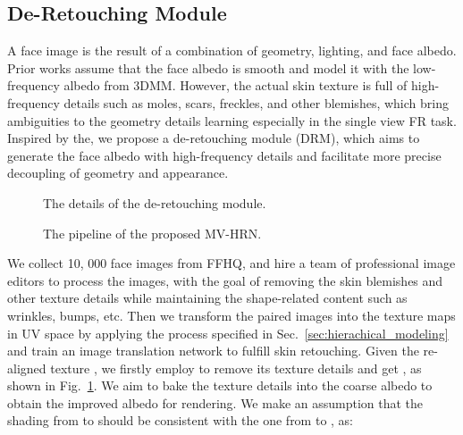\documentclass[10pt,twocolumn,letterpaper]{article}
\begin{document}
\subsection{De-Retouching Module} \label{sec:de-retouching}

A face image is the result of a combination of geometry, lighting, and face albedo. Prior works assume that the face albedo is smooth and model it with the low-frequency albedo from 3DMM. However, the actual skin texture is full of high-frequency details such as moles, scars, freckles, and other blemishes, which bring ambiguities to the geometry details learning especially in the single view FR task. Inspired by the\cite{lei2022abpn}, we propose a de-retouching module (DRM), which aims to generate the face albedo with high-frequency details and facilitate more precise decoupling of geometry and appearance.


\begin{figure}[t]
  \centering
     \vspace{-10pt}
  \caption{The details of the de-retouching module.}
  \label{fig: de-retouching}
  \vspace{-5pt}
\end{figure} 

\begin{figure}[t]
  \centering
     \vspace{-5pt}
  \caption{The pipeline of the proposed MV-HRN.}
  \label{fig: MV-HRN}
  \vspace{-10pt}
\end{figure} 

We collect 10, 000 face images from FFHQ\cite{karras2019style}, and hire a team of professional image editors to process the images, with the goal of removing the skin blemishes and other texture details while maintaining the shape-related content such as wrinkles, bumps, etc. Then we transform the paired images into the texture maps in UV space by applying the process specified in Sec.~\ref{sec:hierachical_modeling} and train an image translation network  to fulfill skin retouching. Given the re-aligned texture , we firstly employ  to remove its texture details and get , as shown in Fig.~\ref{fig: de-retouching}. We aim to bake the texture details into the coarse albedo  to obtain the improved albedo  for rendering. We make an assumption that the shading from  to  should be consistent with the one from  to , as: 
\end{document}

